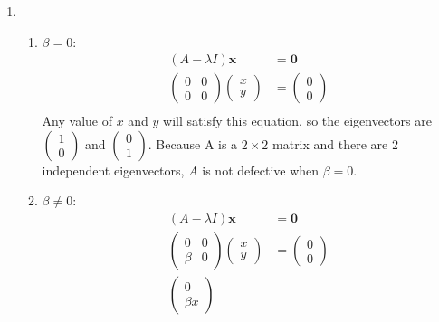 \documentclass[10pt]{article}
\begin{document}
\begin{enumerate}
\begin{enumerate}
            \item
              \begin{enumerate}
                  \item $\beta = 0$:
                    \begin{align*}
                      (A - \lambda I)\mathbf{x} &= \mathbf{0} \\
                      \begin{pmatrix} 0 & 0 \\ 0 & 0 \end{pmatrix}
                      \begin{pmatrix} x \\ y \end{pmatrix}
                        &=
                      \begin{pmatrix} 0 \\ 0 \end{pmatrix} \\
                    \end{align*}
                  Any value of $x$ and $y$ will satisfy this equation, so the eigenvectors are 
                      $\begin{pmatrix} 1 \\ 0 \end{pmatrix}$ and
                      $\begin{pmatrix} 0 \\ 1 \end{pmatrix}$. Because A is a
                        $2\times 2$ matrix and there are 2 independent
                        eigenvectors, $A$ is not defective when $\beta = 0$.
                  \item $\beta \not= 0$:
                    \begin{align*}
                      (A - \lambda I)\mathbf{x} &= \mathbf{0} \\
                      \begin{pmatrix} 0 & 0 \\ \beta & 0 \end{pmatrix}
                      \begin{pmatrix} x \\ y \end{pmatrix}
                        &=
                      \begin{pmatrix} 0 \\ 0 \end{pmatrix} \\
                      \begin{pmatrix} 0 \\ \beta x \end{pmatrix}

\end{align*}
\end{enumerate}
\end{enumerate}
\end{enumerate}
\end{document}
